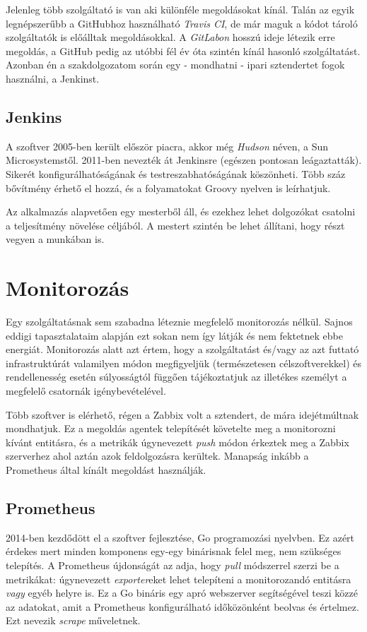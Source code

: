 Jelenleg több szolgáltató is van aki különféle megoldásokat kínál. Talán az egyik legnépszerűbb a GitHubhoz használható \textit{Travis CI}, de már maguk a kódot tároló szolgáltatók is előálltak megoldásokkal. A \textit{GitLabon} hosszú ideje létezik erre megoldás, a GitHub pedig az utóbbi fél év óta szintén kínál hasonló szolgáltatást\cite{GHAction}. Azonban én a szakdolgozatom során egy - mondhatni - ipari sztendertet fogok használni, a Jenkinst.
\subsection{Jenkins}
A szoftver 2005-ben került először piacra, akkor még \textit{Hudson} néven, a Sun Microsystemstől. 2011-ben nevezték át Jenkinsre (egészen pontosan leágaztatták). Sikerét konfigurálhatóságának és testreszabhatóságának köszönheti. Több száz bővítmény érhető el hozzá, és a folyamatokat Groovy nyelven is leírhatjuk.

Az alkalmazás alapvetően egy mesterből áll, és ezekhez lehet dolgozókat csatolni a teljesítmény növelése céljából. A mestert szintén be lehet állítani, hogy részt vegyen a munkában is.
\section{Monitorozás}
Egy szolgáltatásnak sem szabadna léteznie megfelelő monitorozás nélkül. Sajnos eddigi tapasztalataim alapján ezt sokan nem így látják és nem fektetnek ebbe energiát. Monitorozás alatt azt értem, hogy a szolgáltatást és/vagy az azt futtató infrastruktúrát valamilyen módon megfigyeljük (természetesen célszoftverekkel) és rendellenesség esetén súlyosságtól függően tájékoztatjuk az illetékes személyt a megfelelő csatornák igénybevételével.

Több szoftver is elérhető, régen a Zabbix volt a sztendert, de mára idejétmúltnak mondhatjuk. Ez a megoldás agentek telepítését követelte meg a monitorozni kívánt entitásra, és a metrikák úgynevezett \textit{push} módon érkeztek meg a Zabbix szerverhez ahol aztán azok feldolgozásra kerültek. Manapság inkább a Prometheus által kínált megoldást használják.
\subsection{Prometheus}
2014-ben kezdődött el a szoftver fejlesztése, Go programozási nyelvben. Ez azért érdekes mert minden komponens egy-egy binárisnak felel meg, nem szükséges telepítés. A Prometheus újdonságát az adja, hogy \textit{pull} módszerrel szerzi be a metrikákat: úgynevezett \textit{exporter}eket lehet telepíteni a monitorozandó entitásra \textit{vagy} egyéb helyre is. Ez a Go bináris egy apró webszerver segítségével teszi közzé az adatokat, amit a Prometheus konfigurálható időközönként beolvas és értelmez. Ezt nevezik \textit{scrape} műveletnek.

